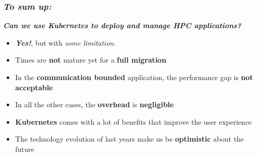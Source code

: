 \begin{frame}
  \frametitle{ \textit{To sum up:}}
  \large{
     \textit\textbf{{Can we use Kubernetes to deploy and manage HPC applications?}}
  }
  \pause
  \begin{itemize}
    \item {} \alert{\textit{\textbf{Yes!}}}, but with \textit{some limitation}.
    \pause
    \item Times are \textbf{not} mature yet for a \alert{\textbf{full migration}}
    \item {} In the \textbf{communication bounded} application, the performance gap
      is \textbf{not acceptable}
    \item In all the other cases, the \alert{\textbf{overhead}} is \alert{\textbf{negligible}}
    \pause
    \item \textbf{Kubernetes} comes with a lot of benefits
      that improve the user experience
    \item {} The technology evolution of last years make us
      be \alert{\textbf{optimistic}} about the future
  \end{itemize}
\end{frame}
